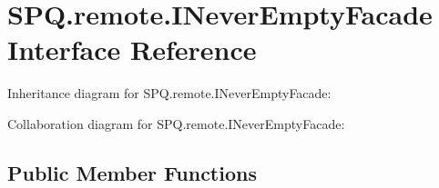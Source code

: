 \hypertarget{interface_s_p_q_1_1remote_1_1_i_never_empty_facade}{}\section{S\+P\+Q.\+remote.\+I\+Never\+Empty\+Facade Interface Reference}
\label{interface_s_p_q_1_1remote_1_1_i_never_empty_facade}


Inheritance diagram for S\+P\+Q.\+remote.\+I\+Never\+Empty\+Facade\+:


Collaboration diagram for S\+P\+Q.\+remote.\+I\+Never\+Empty\+Facade\+:
\subsection*{Public Member Functions}
